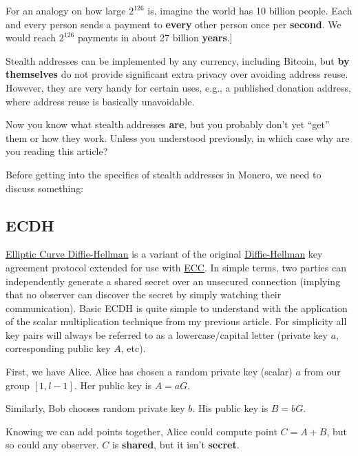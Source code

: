 For an analogy on how large \(2^{126}\) is, imagine the world has 10 billion people. Each and every person sends a payment to \textbf{every} other person once per \textbf{second}. We would reach \(2^{126}\) payments in about 27 billion \textbf{years}.]\par

Stealth addresses can be implemented by any currency, including Bitcoin, but \textbf{by themselves} do not provide significant extra privacy over avoiding address reuse. However, they are very handy for certain uses, e.g., a published donation address, where address reuse is basically unavoidable.\par

Now you know what stealth addresses \textbf{are}, but you probably don't yet ``get'' them or how they work. Unless you understood previously, in which case why are you reading this article?\par

Before getting into the specifics of stealth addresses in Monero, we need to discuss something:

\subsection{ECDH}
\href{https://en.wikipedia.org/wiki/Elliptic_curve_Diffie%E2%80%93Hellman}{Elliptic Curve Diffie-Hellman} is a variant of the original \href{https://en.wikipedia.org/wiki/Diffie%E2%80%93Hellman_key_exchange}{Diffie-Hellman} key agreement protocol extended for use with \href{https://en.wikipedia.org/wiki/Elliptic_curve_cryptography}{ECC}. In simple terms, two parties can independently generate a shared secret over an unsecured connection (implying that no observer can discover the secret by simply watching their communication). Basic ECDH is quite simple to understand with the application of the scalar multiplication technique from my previous article. For simplicity all key pairs will always be referred to as a lowercase/capital letter (private key \(a\), corresponding public key \(A\), etc).\par

	First, we have Alice. Alice has chosen a random private key (scalar) \(a\) from our group \([1, l-1]\). Her public key is \(A = aG\). \par

	Similarly, Bob chooses random private key \(b\). His public key is \(B = bG\).\par

	Knowing we can add points together, Alice could compute point \(C = A + B\), but so could any observer. \(C\) is \textbf{shared}, but it isn't \textbf{secret}.\par


